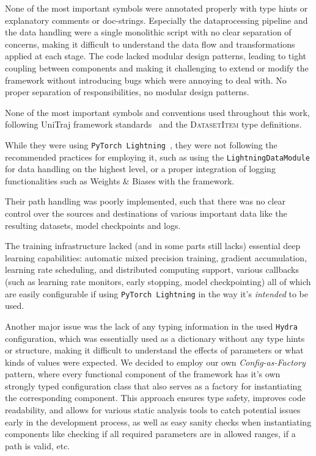 None of the most important symbols were annotated properly with type hints or explanatory comments or doc-strings. Especially the dataprocessing pipeline and the data handling were a single monolithic script with no clear separation of concerns, making it difficult to understand the data flow and transformations applied at each stage. The code lacked modular design patterns, leading to tight coupling between components and making it challenging to extend or modify the framework without introducing bugs which were annoying to deal with.
No proper separation of responsibilities, no modular design patterns.

None of the most important symbols and conventions used throughout this work, following UniTraj framework standards~\cite{unitrajFeng2024} and the \textsc{DatasetItem} type definitions.

While they were using \texttt{PyTorch Lightning}~\cite{falcon2019pytorch}, they were not following the recommended practices for employing it, such as using the \texttt{LightningDataModule} for data handling on the highest level, or a proper integration of logging functionalities such as Weights \& Biases with the framework.

Their path handling was poorly implemented, such that there was no clear control over the sources and destinations of various important data like the resulting datasets, model checkpoints and logs.

The training infrastructure lacked (and in some parts still lacks) essential deep learning capabilities: automatic mixed precision training, gradient accumulation, learning rate scheduling, and distributed computing support, various callbacks (such as learning rate monitors, early stopping, model checkpointing) all of which are easily configurable if using \texttt{PyTorch Lightning} in the way it's \emph{intended} to be used.

Another major issue was the lack of any typing information in the used \texttt{Hydra} configuration, which was essentially used as a dictionary without any type hints or structure, making it difficult to understand the effects of parameters or what kinds of values were expected. We decided to employ our own \emph{Config-as-Factory} pattern, where every functional component of the framework has it's own strongly typed configuration class that also serves as a factory for instantiating the corresponding component. This approach ensures type safety, improves code readability, and allows for various static analysis tools to catch potential issues early in the development process, as well as easy sanity checks when instantiating components like checking if all required parameters are in allowed ranges, if a path is valid, etc.



